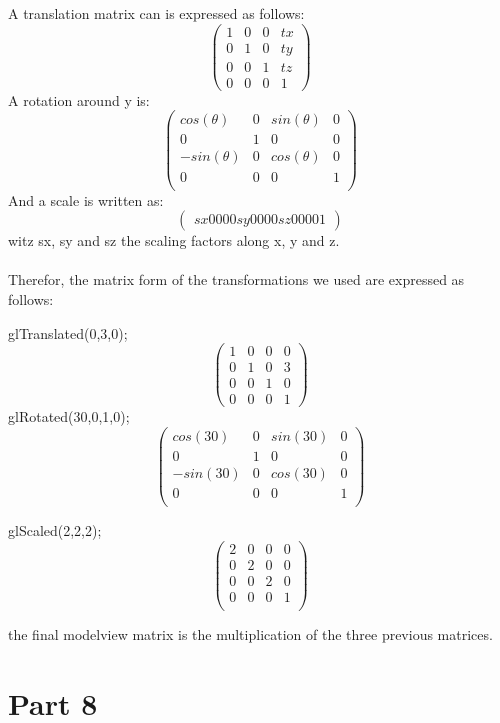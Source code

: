 A translation matrix can is expressed as follows:
$$
\begin{pmatrix}
	1&	0& 	0&	tx\\
	0&	1&	0&	ty\\
	0&	0&	1&	tz\\
	0&	0&	0&	1
\end{pmatrix}
$$
A rotation around y is:
$$
\begin{pmatrix}
	cos(\theta)&	0& 	sin(\theta)&	0\\
	0&	        1&	0&	        0\\
	-sin(\theta)&	0&	cos(\theta)&	0\\
	0&	        0&	0&	        1\\
\end{pmatrix}
$$
And a scale is written as:
$$
\begin{pmatrix}
	sx	0 	0	0
	0	sy	0	0
	0	0	sz	0
	0	0	0	1
\end{pmatrix}
$$
witz sx, sy and sz the scaling factors along x, y and z.\\
~\\
Therefor, the matrix form of the transformations we used are expressed as follows:

glTranslated(0,3,0);
$$
\begin{pmatrix}
	1&	0& 	0&	0\\
	0&	1&	0&	3\\
	0&	0&	1&	0\\
	0&	0&	0&	1
\end{pmatrix}$$
glRotated(30,0,1,0);
$$\begin{pmatrix}
	cos(30)&	0& 	sin(30)&	0\\
	0&	        1&	0&	        0\\
	-sin(30)&	0&	cos(30)&	0\\
	0&	        0&	0&	        1\\
\end{pmatrix}$$

glScaled(2,2,2);
$$\begin{pmatrix}
	2&	0& 	0&	0\\
	0&	2&	0&	0\\
	0&	0&	2&	0\\
	0&	0&	0&	1\\
\end{pmatrix}$$

the final modelview matrix is the multiplication of the three previous matrices.


\section{Part 8}


